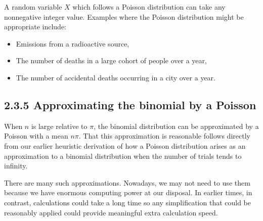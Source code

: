 \documentclass[letterpaper,10pt,english]{jupyterBook}
\begin{document}
\sphinxAtStartPar
{}

\sphinxAtStartPar
A random variable \(X\) which follows a Poisson distribution can  take any non\sphinxhyphen{}negative integer value. Examples where the Poisson distribution might be appropriate include:
\begin{itemize}
\item {} 
\sphinxAtStartPar
Emissions from a radioactive source,

\item {} 
\sphinxAtStartPar
The number of deaths in a large cohort of people over a year,

\item {} 
\sphinxAtStartPar
The number of accidental deaths occurring in a city over a year.

\end{itemize}


\subsection{2.3.5 Approximating the binomial by a Poisson}
\label{\detokenize{02.d. Probability.Discrete:approximating-the-binomial-by-a-poisson}}
\sphinxAtStartPar
When \(n\) is large relative to \(\pi\), the binomial distribution can be approximated by a Poisson with a
mean \(n\pi\). That this approximation is reasonable follows directly from our earlier heuristic derivation
of how a Poisson distribution arises as an approximation to a binomial distribution when the number
of trials tends to infinity.

\sphinxAtStartPar
There are many such approximations. Nowadays, we may not need to use them because we have enormous computing power at our disposal. In earlier times, in contrast, calculations could take a long time so any simplification that could be reasonably applied could provide meaningful extra calculation speed.
\end{document}
